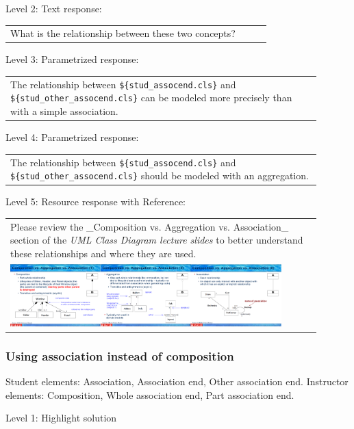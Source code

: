 \noindent Level 2: Text response: \medskip

\begin{tabular}{|p{0.9\linewidth}}
What is the relationship between these two concepts?
\end{tabular} \medskip

\noindent Level 3: Parametrized response: \medskip

\begin{tabular}{|p{0.9\linewidth}}
The relationship between \verb|${stud_assocend.cls}| and \verb|${stud_other_assocend.cls}| can be modeled more precisely than with a simple association.
\end{tabular} \medskip

\noindent Level 4: Parametrized response: \medskip

\begin{tabular}{|p{0.9\linewidth}}
The relationship between \verb|${stud_assocend.cls}| and \verb|${stud_other_assocend.cls}| should be modeled with an aggregation.
\end{tabular} \medskip

\noindent Level 5: Resource response with Reference: \medskip

\begin{tabular}{|p{0.9\linewidth}}
Please review the _Composition vs. Aggregation vs. Association_ section of 
the \textit{UML Class Diagram lecture slides} to 
better understand these relationships and where they are used.

\\
\includegraphics[width=0.9\textwidth]{images/composition_aggregation_association.png}
\end{tabular} \medskip


\subsubsection{Using association instead of composition}

Student elements: Association, Association end, Other association end. Instructor elements: Composition, Whole association end, Part association end. \medskip

\noindent Level 1: Highlight solution  \medskip

